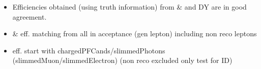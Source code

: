 \documentclass{beamer}
\begin{document}
\begin{frame}
\begin{columns}
\begin{column}{0.33\textwidth}
   \end{column}
  \end{columns}
\begin{itemize}
 \item Efficiencies obtained (using truth information) from \ttbar \& \wpj and DY are in good agreement.
 \item \ttbar \& \wpj eff. matching from all in acceptance (gen lepton) including non reco leptons
 \item \Zll eff. start with chargedPFCands/slimmedPhotons (slimmedMuon/slimmedElectron) (non reco excluded only test for ID)
\end{itemize}

\end{frame}
\end{document}
